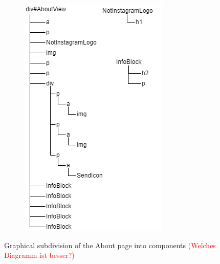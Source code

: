 \documentclass[a4paper, 10pt]{article}
\begin{document}
\begin{figure}
\begin{center}
\begin{subfigure}{0.49\linewidth}
\begin{center}
      \end{center}
    \end{subfigure}
    \begin{subfigure}{0.49\linewidth}
      \begin{center}
        \includegraphics[width=\linewidth, keepaspectratio]{diagrams/about-dom-2.png}
      \end{center}
    \end{subfigure}
  \end{center}
  \caption{Graphical subdivision of the About page into components \textcolor{red}{(Welches Diagramm ist besser?)}}\label{fig:graphicalAboutPage}
\end{figure}
\end{document}
